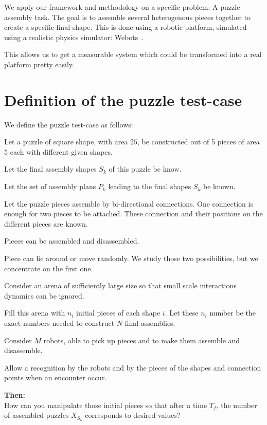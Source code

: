 We apply our framework and methodology on a specific problem: A puzzle assembly task. The goal is to assemble several heterogenous pieces together to create a specific final shape. This is done using a robotic platform, simulated using a realistic physics simulator: Webots~\cite{Michel:2004p10762}.

This allows us to get a measurable system which could be transformed into a real platform pretty easily.

\section{Definition of the puzzle test-case} %
\label{sec:definition_of_the_puzzle_test_case}

We define the puzzle test-case as follows:
\begin{my_itemize}
	\item Let a puzzle of square shape, with area $25$, be constructed out of 5 pieces of area 5 each with different given shapes.
	\item Let the final assembly shapes $S_k$ of this puzzle be know.
	\item Let the set of assembly plans $P_k$ leading to the final shapes $S_k$ be known. 
	\item Let the puzzle pieces assemble by bi-directional connections. One connection is enough for two pieces to be attached. These connection and their positions on the different pieces are known.
	\item Pieces can be assembled and disassembled.
	\item Piece can lie around or move randomly. We study those two possibilities, but we concentrate on the first one. 
	\item Consider an arena of sufficiently large size so that small scale interactions dynamics can be ignored.
	\item Fill this arena with $n_i$ initial pieces of each shape $i$. Let these $n_i$ number be the exact numbers needed to construct $N$ final assemblies.
	\item Consider $M$ robots, able to pick up pieces and to make them assemble and disassemble.
	\item Allow a recognition by the robots and by the pieces of the shapes and connection points when an encounter occur.
	\item \textbf{Then:}\\
	How can you manipulate those initial pieces so that after a time $T_f$, the number of assembled puzzles $X_{S_k}$ corresponds to desired values?
\end{my_itemize}

